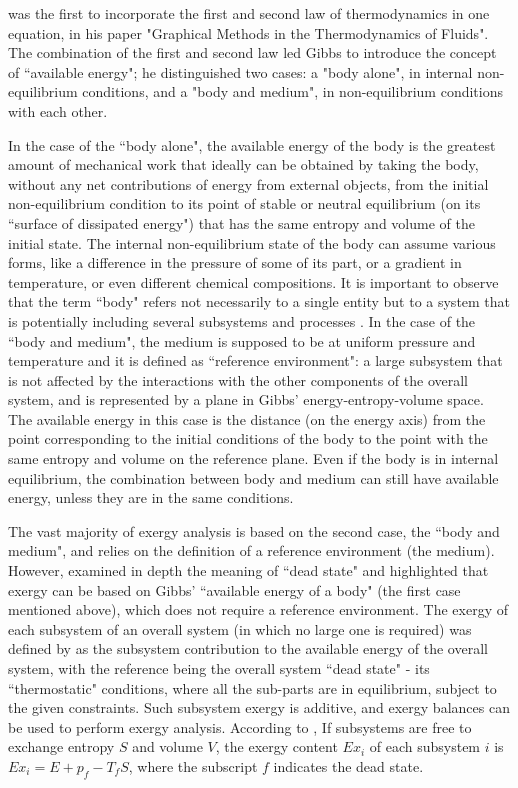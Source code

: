 \documentclass[10pt]{extarticle} %
\begin{document}
\cite{Gibbs1873} was the first to incorporate the first and second law of thermodynamics in one equation, in his paper "Graphical Methods in the Thermodyna\-mics of Fluids".  The combination of the first and second law led Gibbs to introduce the concept of ``available energy"; he distinguished two cases: a "body alone", in internal non-equilibrium conditions, and a "body and medium", in non-equilibrium conditions with each other. 

In the case of the ``body alone", the available energy of the body is the greatest amount of mechanical work that ideally can be obtained by taking the body, without any net contributions of energy from external objects, from the initial non-equilibrium condition to its point of stable or neutral equilibrium (on its ``surface of dissipated energy") that has the same entropy and volume of the initial state. The internal non-equilibrium state of the body can assume various forms, like a difference in the pressure of some of its part, or a gradient in temperature, or even different chemical compositions. It is important to observe that the term ``body" refers not necessarily to a single entity but to a system that is potentially including several subsystems and processes \citep{Gaggioli2012}.
In the case of the ``body and medium", the medium is supposed to be at uniform pressure and temperature and it is defined as ``reference environment": a large subsystem that is not affected by the interactions with the other components of the overall system, and is represented by a plane in Gibbs' energy-entropy-volume space. The available energy in this case is the distance (on the energy axis) from the point corresponding to the initial conditions of the body to the point with the same entropy and volume on the reference plane. Even if the body is in internal equilibrium, the combination between body and medium can still have available energy, unless they are in the same conditions. 


The vast majority of exergy analysis is based on the second case, the  ``body and medium", and relies on the definition of a reference environment (the medium). However, \cite{Gaggioli2012} examined in depth the meaning of ``dead state" and highlighted that exergy can be based on Gibbs' ``available energy of a body" (the first case mentioned above), which does not require a reference environment. The exergy of each subsystem of an overall system (in which no large one is required) was defined by \cite{Gaggioli1998} as the subsystem contribution to the available energy of the overall system, with the reference being the overall system ``dead state" - its ``thermostatic" conditions, where all the sub-parts are in equilibrium, subject to the given constraints. Such subsystem exergy is additive, and exergy balances can be used to perform exergy analysis. According to \cite{Gaggioli2012}, If subsystems are free to exchange entropy $S$ and volume $V$, the exergy content $Ex_i$ of each subsystem $i$ is $Ex_i = E + p_f - T_fS$, where the subscript $f$ indicates the dead state.
\end{document}
